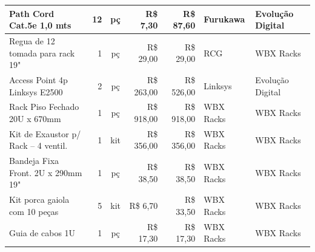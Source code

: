 \documentclass[	DIV=calc,%
							paper=a4,%
							fontsize=12pt,%
							onecolumn]{scrartcl}	 					%
\begin{document}
\begin{table}[H]
{\begin{tabular}{lrcrrll}
		\multicolumn{1}{|l|}{Path Cord Cat.5e 1,0 mts}             & \multicolumn{1}{r|}{12}            & \multicolumn{1}{c|}{pç}            & \multicolumn{1}{r|}{R\$ 7,30}             & \multicolumn{1}{r|}{R\$ 87,60}         & \multicolumn{1}{l|}{Furukawa}       & \multicolumn{1}{l|}{Evolução Digital}     \\ \hline
		\multicolumn{1}{|l|}{Regua de 12 tomada para rack 19"}     & \multicolumn{1}{r|}{1}             & \multicolumn{1}{c|}{pç}            & \multicolumn{1}{r|}{R\$ 29,00}            & \multicolumn{1}{r|}{R\$ 29,00}         & \multicolumn{1}{l|}{RCG}            & \multicolumn{1}{l|}{WBX Racks}            \\ \hline
		\multicolumn{1}{|l|}{Access Point 4p Linksys E2500}        & \multicolumn{1}{r|}{2}             & \multicolumn{1}{c|}{pç}            & \multicolumn{1}{r|}{R\$ 263,00}           & \multicolumn{1}{r|}{R\$ 526,00}        & \multicolumn{1}{l|}{Linksys}        & \multicolumn{1}{l|}{Evolução Digital}     \\ \hline
		\multicolumn{1}{|l|}{Rack Piso Fechado 20U x 670mm}        & \multicolumn{1}{r|}{1}             & \multicolumn{1}{c|}{pç}            & \multicolumn{1}{r|}{R\$ 918,00}           & \multicolumn{1}{r|}{R\$ 918,00}        & \multicolumn{1}{l|}{WBX Racks}      & \multicolumn{1}{l|}{WBX Racks}            \\ \hline
		\multicolumn{1}{|l|}{Kit de Exaustor p/ Rack – 4 ventil.}  & \multicolumn{1}{r|}{1}             & \multicolumn{1}{c|}{kit}           & \multicolumn{1}{r|}{R\$ 356,00}           & \multicolumn{1}{r|}{R\$ 356,00}        & \multicolumn{1}{l|}{WBX Racks}      & \multicolumn{1}{l|}{WBX Racks}            \\ \hline
		\multicolumn{1}{|l|}{Bandeja Fixa Front. 2U x 290mm 19"}   & \multicolumn{1}{r|}{1}             & \multicolumn{1}{c|}{pç}            & \multicolumn{1}{r|}{R\$ 38,50}            & \multicolumn{1}{r|}{R\$ 38,50}         & \multicolumn{1}{l|}{WBX Racks}      & \multicolumn{1}{l|}{WBX Racks}            \\ \hline
		\multicolumn{1}{|l|}{Kit porca gaiola com 10 peças}        & \multicolumn{1}{r|}{5}             & \multicolumn{1}{c|}{kit}           & \multicolumn{1}{r|}{R\$ 6,70}             & \multicolumn{1}{r|}{R\$ 33,50}         & \multicolumn{1}{l|}{WBX Racks}      & \multicolumn{1}{l|}{WBX Racks}            \\ \hline
		\multicolumn{1}{|l|}{Guia de cabos 1U}                     & \multicolumn{1}{r|}{1}             & \multicolumn{1}{c|}{pç}            & \multicolumn{1}{r|}{R\$ 17,30}            & \multicolumn{1}{r|}{R\$ 17,30}         & \multicolumn{1}{l|}{WBX Racks}      & \multicolumn{1}{l|}{WBX Racks}            \\ \hline

\end{tabular}}
\end{table}
\end{document}
